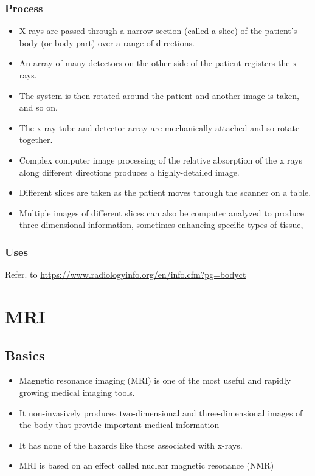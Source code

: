 \documentclass[12pt]{book}
\begin{document}
\subsection{Process}
\begin{itemize}
	\item X rays are passed through a narrow section (called a slice) of the patient’s body (or body part) over a range of directions.
	\item An array of many detectors on the other side of the patient registers the x rays.
	\item The system is then rotated around the patient and another image is taken, and so on.
	\item The x-ray tube and detector array are mechanically attached and so rotate together.
	\item Complex computer image processing of the relative absorption of the x rays along different directions produces a highly-detailed image.
	\item Different slices are taken as the patient moves through the scanner on a table.
	\item Multiple images of different slices can also be computer analyzed to produce three-dimensional information, sometimes enhancing specific types of tissue,
\end{itemize}
\subsection{Uses}
Refer. to \url{https://www.radiologyinfo.org/en/info.cfm?pg=bodyct}

\chapter{MRI}
\section{Basics}
\begin{itemize}
\item Magnetic resonance imaging (MRI) is one of the most useful and rapidly growing medical imaging tools.
\item It non-invasively produces two-dimensional and three-dimensional images of the body that provide important medical information
\item It has none of the hazards like those associated with x-rays.
\item  MRI is based on an effect called nuclear magnetic resonance (NMR)
\end{itemize}
\end{document}
